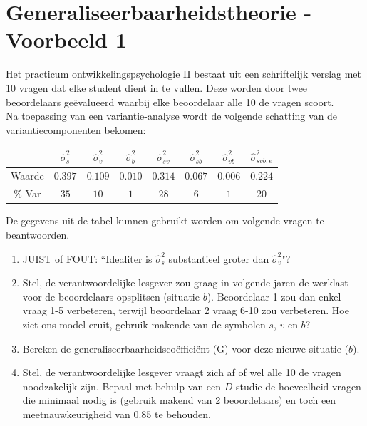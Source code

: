 
\OPGAVE
{
\section{Generaliseerbaarheidstheorie - Voorbeeld 1}

Het practicum ontwikkelingspsychologie II bestaat uit een schriftelijk verslag met 10 vragen dat elke student dient in te vullen. Deze worden door twee beoordelaars ge\"{e}valueerd waarbij elke beoordelaar alle 10 de vragen scoort.\\
Na toepassing van een variantie-analyse wordt de volgende schatting van de variantiecomponenten bekomen:

\begin{center}
\renewcommand{\arraystretch}{1.2}
\begin{tabular}{|c|c|c|c|c|c|c|c|} \hline
 & $ \hat{\sigma}^2_{s} $ & $ \hat{\sigma}^2_{v} $& $ \hat{\sigma}^2_{b} $ & $ \hat{\sigma}^2_{sv} $ & $ \hat{\sigma}^2_{sb} $ & $ \hat{\sigma}^2_{vb} $ & $ \hat{\sigma}^2_{svb,e} $ \\ \hline
Waarde  & $ 0.397 $ & $ 0.109 $ & $ 0.010 $ & $ 0.314 $ & $ 0.067 $ & $ 0.006 $ & $ 0.224 $ \\
\% Var & $ 35 $ & $ 10 $ & $ 1 $ & $ 28 $ & $ 6 $ & $ 1 $ & $ 20 $ \\ \hline
\end{tabular}
\end{center}


\normalsize
De gegevens uit de tabel kunnen gebruikt worden om volgende vragen te beantwoorden.

\begin{enumerate}
\item JUIST of FOUT: ``Idealiter is $ \hat{\sigma}^2_{s} $ substantieel groter dan $ \hat{\sigma}^2_{v}$"?
\item Stel, de verantwoordelijke lesgever zou graag in volgende jaren de werklast voor de beoordelaars opsplitsen (situatie $b$).
Beoordelaar 1 zou dan enkel vraag 1-5 verbeteren, terwijl beoordelaar 2 vraag 6-10 zou verbeteren.
Hoe ziet ons model eruit, gebruik makende van de symbolen $s$, $v$ en $b$?
\item Bereken de generaliseerbaarheidsco\"{e}ffici\"{e}nt (G) voor deze nieuwe situatie ($b$).

\item Stel, de verantwoordelijke lesgever vraagt zich af of wel alle 10 de vragen noodzakelijk zijn. Bepaal met behulp van een $D$-studie de hoeveelheid vragen die minimaal nodig is (gebruik makend van 2 beoordelaars) en toch een meetnauwkeurigheid van 0.85 te behouden.

\end{enumerate}
}


